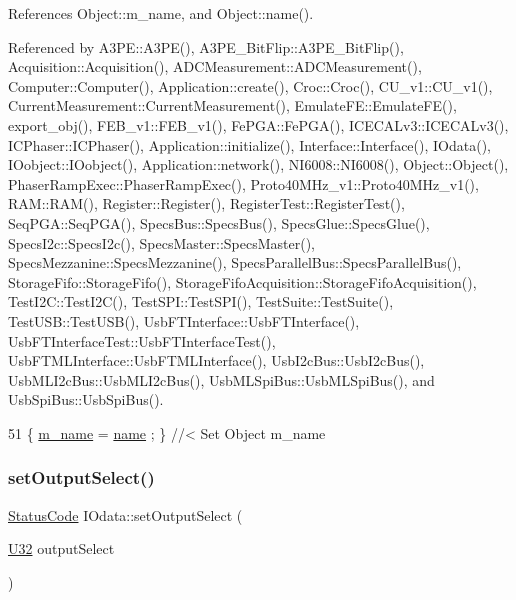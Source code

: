 References Object\+::m\+\_\+name, and Object\+::name().



Referenced by A3\+P\+E\+::\+A3\+P\+E(), A3\+P\+E\+\_\+\+Bit\+Flip\+::\+A3\+P\+E\+\_\+\+Bit\+Flip(), Acquisition\+::\+Acquisition(), A\+D\+C\+Measurement\+::\+A\+D\+C\+Measurement(), Computer\+::\+Computer(), Application\+::create(), Croc\+::\+Croc(), C\+U\+\_\+v1\+::\+C\+U\+\_\+v1(), Current\+Measurement\+::\+Current\+Measurement(), Emulate\+F\+E\+::\+Emulate\+F\+E(), export\+\_\+obj(), F\+E\+B\+\_\+v1\+::\+F\+E\+B\+\_\+v1(), Fe\+P\+G\+A\+::\+Fe\+P\+G\+A(), I\+C\+E\+C\+A\+Lv3\+::\+I\+C\+E\+C\+A\+Lv3(), I\+C\+Phaser\+::\+I\+C\+Phaser(), Application\+::initialize(), Interface\+::\+Interface(), I\+Odata(), I\+Oobject\+::\+I\+Oobject(), Application\+::network(), N\+I6008\+::\+N\+I6008(), Object\+::\+Object(), Phaser\+Ramp\+Exec\+::\+Phaser\+Ramp\+Exec(), Proto40\+M\+Hz\+\_\+v1\+::\+Proto40\+M\+Hz\+\_\+v1(), R\+A\+M\+::\+R\+A\+M(), Register\+::\+Register(), Register\+Test\+::\+Register\+Test(), Seq\+P\+G\+A\+::\+Seq\+P\+G\+A(), Specs\+Bus\+::\+Specs\+Bus(), Specs\+Glue\+::\+Specs\+Glue(), Specs\+I2c\+::\+Specs\+I2c(), Specs\+Master\+::\+Specs\+Master(), Specs\+Mezzanine\+::\+Specs\+Mezzanine(), Specs\+Parallel\+Bus\+::\+Specs\+Parallel\+Bus(), Storage\+Fifo\+::\+Storage\+Fifo(), Storage\+Fifo\+Acquisition\+::\+Storage\+Fifo\+Acquisition(), Test\+I2\+C\+::\+Test\+I2\+C(), Test\+S\+P\+I\+::\+Test\+S\+P\+I(), Test\+Suite\+::\+Test\+Suite(), Test\+U\+S\+B\+::\+Test\+U\+S\+B(), Usb\+F\+T\+Interface\+::\+Usb\+F\+T\+Interface(), Usb\+F\+T\+Interface\+Test\+::\+Usb\+F\+T\+Interface\+Test(), Usb\+F\+T\+M\+L\+Interface\+::\+Usb\+F\+T\+M\+L\+Interface(), Usb\+I2c\+Bus\+::\+Usb\+I2c\+Bus(), Usb\+M\+L\+I2c\+Bus\+::\+Usb\+M\+L\+I2c\+Bus(), Usb\+M\+L\+Spi\+Bus\+::\+Usb\+M\+L\+Spi\+Bus(), and Usb\+Spi\+Bus\+::\+Usb\+Spi\+Bus().


\begin{DoxyCode}
51 \{ \hyperlink{classObject_a8b83c95c705d2c3ba0d081fe1710f48d}{m\_name}  = \hyperlink{classObject_a300f4c05dd468c7bb8b3c968868443c1}{name}  ; \} \textcolor{comment}{//< Set Object m\_name}
\end{DoxyCode}
\mbox{\label{classIOdata_a09675d3efa14ba00cc22f8ff8d463389}} 
\subsubsection{\texorpdfstring{set\+Output\+Select()}{setOutputSelect()}}
{\footnotesize\ttfamily \hyperlink{classStatusCode}{Status\+Code} I\+Odata\+::set\+Output\+Select (\begin{DoxyParamCaption}\item[{\hyperlink{classIOdata_a96fb57f5fcd87b708743abd3c86a5198}{U32}}]{output\+Select }\end{DoxyParamCaption})\hspace{0.3cm}{\ttfamily [inline]}}

